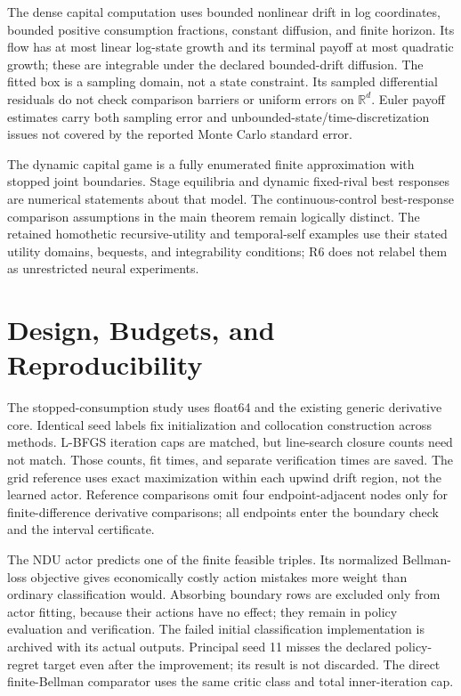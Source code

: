 The dense capital computation uses bounded nonlinear drift in log coordinates, bounded positive consumption fractions, constant diffusion, and finite horizon. Its flow has at most linear log-state growth and its terminal payoff at most quadratic growth; these are integrable under the declared bounded-drift diffusion. The fitted box is a sampling domain, not a state constraint. Its sampled differential residuals do not check comparison barriers or uniform errors on $\mathbb R^d$. Euler payoff estimates carry both sampling error and unbounded-state/time-discretization issues not covered by the reported Monte Carlo standard error.

The dynamic capital game is a fully enumerated finite approximation with stopped joint boundaries. Stage equilibria and dynamic fixed-rival best responses are numerical statements about that model. The continuous-control best-response comparison assumptions in the main theorem remain logically distinct. The retained homothetic recursive-utility and temporal-self examples use their stated utility domains, bequests, and integrability conditions; R6 does not relabel them as unrestricted neural experiments.

\section{Design, Budgets, and Reproducibility}
The stopped-consumption study uses float64 and the existing generic derivative core. Identical seed labels fix initialization and collocation construction across methods. L-BFGS iteration caps are matched, but line-search closure counts need not match. Those counts, fit times, and separate verification times are saved. The grid reference uses exact maximization within each upwind drift region, not the learned actor. Reference comparisons omit four endpoint-adjacent nodes only for finite-difference derivative comparisons; all endpoints enter the boundary check and the interval certificate.

The NDU actor predicts one of the finite feasible triples. Its normalized Bellman-loss objective gives economically costly action mistakes more weight than ordinary classification would. Absorbing boundary rows are excluded only from actor fitting, because their actions have no effect; they remain in policy evaluation and verification. The failed initial classification implementation is archived with its actual outputs. Principal seed 11 misses the declared policy-regret target even after the improvement; its result is not discarded. The direct finite-Bellman comparator uses the same critic class and total inner-iteration cap.

